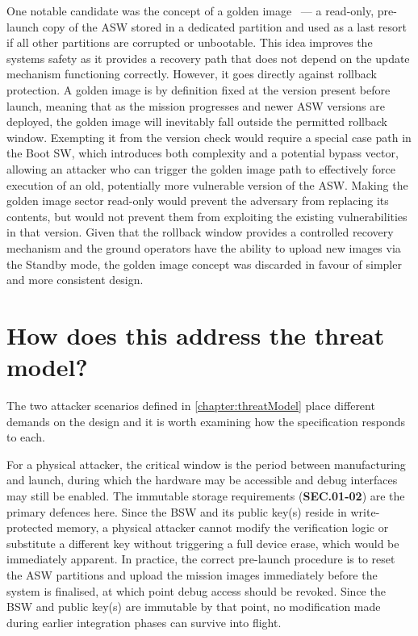 One notable candidate was the concept of a golden image \cite{cubesat_flight_software}~--- a read-only, pre-launch copy of the ASW stored in a dedicated partition and used as a last resort if all other partitions are corrupted or unbootable. This idea improves the systems safety as it provides a recovery path that does not depend on the update mechanism functioning correctly. However, it goes directly against rollback protection. A golden image is by definition fixed at the version present before launch, meaning that as the mission progresses and newer ASW versions are deployed, the golden image will inevitably fall outside the permitted rollback window. Exempting it from the version check would require a special case path in the Boot SW, which introduces both complexity and a potential bypass vector, allowing an attacker who can trigger the golden image path to effectively force execution of an old, potentially more vulnerable version of the ASW. Making the golden image sector read-only would prevent the adversary from replacing its contents, but would not prevent them from exploiting the existing vulnerabilities in that version. Given that the rollback window provides a controlled recovery mechanism and the ground operators have the ability to upload new images via the Standby mode, the golden image concept was discarded in favour of simpler and more consistent design.

\section{How does this address the threat model?}
\label{section:design-threatModel}

The two attacker scenarios defined in \autoref{chapter:threatModel} place different demands on the design and it is worth examining how the specification responds to each.

For a physical attacker, the critical window is the period between manufacturing and launch, during which the hardware may be accessible and debug interfaces may still be enabled. The immutable storage requirements (\textbf{SEC.01-02}) are the primary defences here. Since the BSW and its public key(s) reside in write-protected memory, a physical attacker cannot modify the verification logic or substitute a different key without triggering a full device erase, which would be immediately apparent. In practice, the correct pre-launch procedure is to reset the ASW partitions and upload the mission images immediately before the system is finalised, at which point debug access should be revoked. Since the BSW and public key(s) are immutable by that point, no modification made during earlier integration phases can survive into flight.

